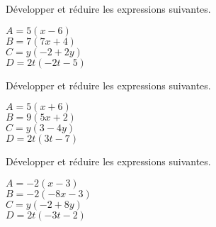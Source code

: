 \documentclass[a4paper,11pt,fleqn]{article}
\begin{document}
\begin{multicols}{2}

Développer et réduire les expressions suivantes.

\begin{multicols}{2}
$A=  5 (x  -6)$\\
$B= 7 ( 7 x    +4)$\\
$C=y( -2  +2 y)$\\
$D= 2  t(  -2 t -5)$
\end{multicols}

%
%
%


Développer et réduire les expressions suivantes.

\begin{multicols}{2}
$A=  5 (x  +6)$\\
$B= 9 ( 5 x    +2)$\\
$C=y( 3  -4 y)$\\
$D= 2  t(  3 t -7)$
\end{multicols}

%
%
%


Développer et réduire les expressions suivantes.

\begin{multicols}{2}
$A=  -2 (x  -3)$\\
$B= -2 ( -8 x    -3)$\\
$C=y( -2  +8 y)$\\
$D= 2  t(  -3 t -2)$
\end{multicols}

%
%
%


\end{multicols}
\end{document}
